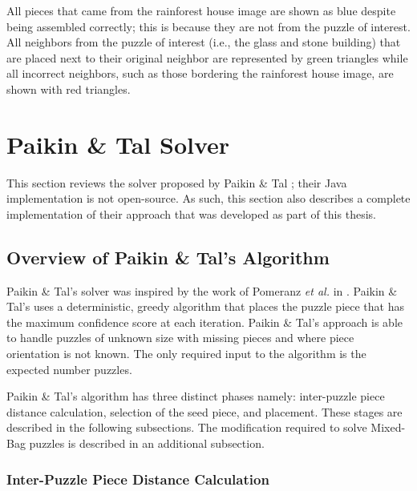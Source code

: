 \documentclass{report}
\begin{document}
All pieces that came from the rainforest house image are shown as blue despite being assembled correctly; this is because they are not from the puzzle of interest.  All neighbors from the puzzle of interest (i.e., the glass and stone building) that are placed next to their original neighbor are represented by green triangles while all incorrect neighbors, such as those bordering the rainforest house image, are shown with red triangles.









\pagebreak
\section{Paikin \& Tal Solver}\label{sec:paikinTalSolver}

This section reviews the solver proposed by Paikin \& Tal \cite{paikin2015}; their Java implementation is not open-source.  As such, this section also describes a complete implementation of their approach that was developed as part of this thesis.

\subsection{Overview of Paikin \& Tal's Algorithm}\label{sec:paikinTalAlgorithm}

Paikin \& Tal's solver was inspired by the work of Pomeranz \textit{et al.} in \cite{pomeranz2011}.  Paikin \& Tal's uses a deterministic, greedy algorithm that places the puzzle piece that has the maximum confidence score at each iteration. Paikin \& Tal's approach is able to handle puzzles of unknown size with missing pieces and where piece orientation is not known.  The only required input to the algorithm is the expected number puzzles.

Paikin \& Tal's algorithm has three distinct phases namely: inter-puzzle piece distance calculation, selection of the seed piece, and placement.  These stages are described in the following subsections.  The modification required to solve Mixed-Bag puzzles is described in an additional subsection.

\subsubsection{Inter-Puzzle Piece Distance Calculation}\label{sec:paikinTalInterPieceDistance}
\end{document}
